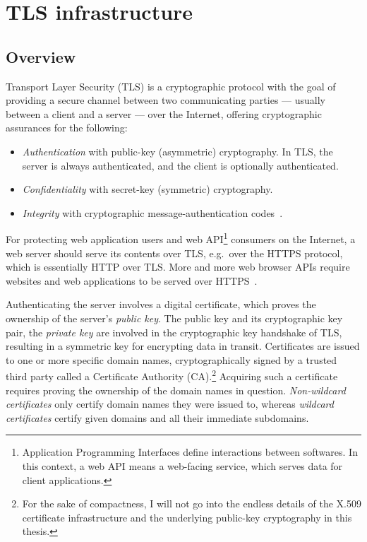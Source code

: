 \section{TLS infrastructure}

\subsection{Overview}

Transport Layer Security (TLS) is a cryptographic protocol with the goal of providing a secure channel between two communicating parties — usually between a client and a server — over the Internet, offering cryptographic assurances for the following:

\begin{itemize}
\item \emph{Authentication} with public-key (asymmetric) cryptography. In TLS, the server is always authenticated, and the client is optionally authenticated.
\item \emph{Confidentiality} with secret-key (symmetric) cryptography.
\item \emph{Integrity} with cryptographic message-authentication codes~\cite{rfc8446}.
\end{itemize}

For protecting web application users and web API\footnote{Application Programming Interfaces define interactions between softwares. In this context, a web API means a web-facing service, which serves data for client applications.} consumers on the Internet, a web server should serve its contents over TLS, e.g.\ over the HTTPS protocol, which is essentially HTTP over TLS. More and more web browser APIs require websites and web applications to be served over HTTPS~\cite{secure-context-features}.

Authenticating the server involves a digital certificate, which proves the ownership of the server's \emph{public key}. The public key and its cryptographic key pair, the \emph{private key} are involved in the cryptographic key handshake of TLS, resulting in a symmetric key for encrypting data in transit. Certificates are issued to one or more specific domain names, cryptographically signed by a trusted third party called a Certificate Authority (CA).\footnote{For the sake of compactness, I will not go into the endless details of the X.509 certificate infrastructure and the underlying public-key cryptography in this thesis.} Acquiring such a certificate requires proving the ownership of the domain names in question. \emph{Non-wildcard certificates} only certify domain names they were issued to, whereas \emph{wildcard certificates} certify given domains and all their immediate subdomains.

